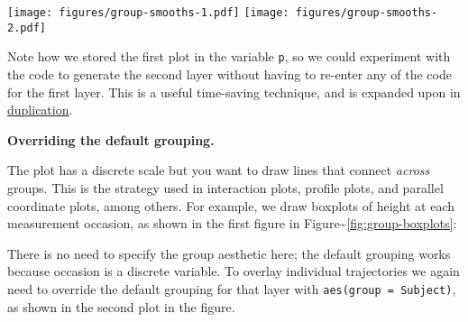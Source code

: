 \begin{Shaded}
\begin{Highlighting}[]
 \NormalTok{) +}
\StringTok{  }\NormalTok{(}\NormalTok{, } 
 \NormalTok{) +}
\StringTok{  }\NormalTok{(}\NormalTok{(} \NormalTok{), }\NormalTok{, } \NormalTok{, } 
\end{Highlighting}
\end{Shaded}

\texttt{[image: figures/group-smooths-1.pdf]}
\texttt{[image: figures/group-smooths-2.pdf]}

Note how we stored the first plot in the variable \texttt{p}, so we
could experiment with the code to generate the second layer without
having to re-enter any of the code for the first layer. This is a useful
time-saving technique, and is expanded upon in
\hyperref[cha:duplication]{duplication}.

\textbf{Overriding the default grouping.}

The plot has a discrete scale but you want to draw lines that connect
\emph{across} groups. This is the strategy used in interaction plots,
profile plots, and parallel coordinate plots, among others. For example,
we draw boxplots of height at each measurement occasion, as shown in the
first figure in Figure\textasciitilde{}\ref{fig:group-boxplots}:

\begin{Shaded}
\begin{Highlighting}[]
\StringTok{ }\StringTok{ }\NormalTok{()}
\end{Highlighting}
\end{Shaded}

\noindent There is no need to specify the group aesthetic here; the
default grouping works because occasion is a discrete variable. To
overlay individual trajectories we again need to override the default
grouping for that layer with \texttt{aes(group = Subject)}, as shown in
the second plot in the figure.


